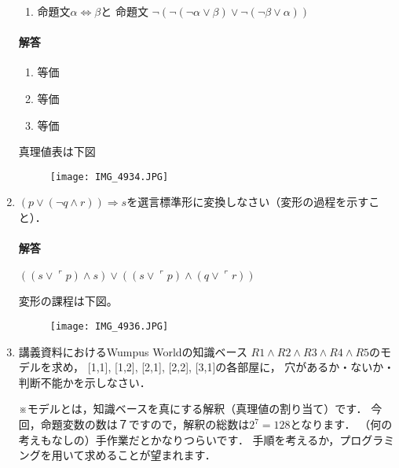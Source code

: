\documentclass[dvipdfmx]{jsarticle}
\begin{document}
\begin{enumerate}
\begin{enumerate}
  \item
    命題文$\alpha\Leftrightarrow\beta$と
    命題文
    $\neg( \neg(\neg\alpha\lor\beta)\lor\neg(\neg\beta\lor\alpha) )$
  \end{enumerate}
  \paragraph{解答}
  \begin{enumerate}
    \item 等価
    \item 等価
    \item 等価
  \end{enumerate}
  真理値表は下図
  \begin{figure}[H]
    \centering
    \texttt{[image: IMG\_4934.JPG]}
  \end{figure}


\item
  $(p\lor(\neg q\land r))\Rightarrow s$を選言標準形に変換しなさい（変形の過程を示すこと）．
\paragraph{解答}
$((s \vee \ulcorner p)\wedge s)\vee ((s\vee \ulcorner p)\wedge (q \vee \ulcorner r))$\par
変形の課程は下図。
\begin{figure}[H]
  \centering
  \texttt{[image: IMG\_4936.JPG]}
\end{figure}



\item
  講義資料におけるWumpus Worldの知識ベース
  $R1 \land R2 \land R3 \land R4 \land R5$のモデルを求め，
  [1,1], [1,2], [2,1], [2,2], [3,1]の各部屋に，
  穴があるか・ないか・判断不能かを示しなさい．

  ※モデルとは，知識ベースを真にする解釈（真理値の割り当て）です．
  今回，命題変数の数は７ですので，解釈の総数は$2^7=128$となります．
  （何の考えもなしの）手作業だとかなりつらいです．
  手順を考えるか，プログラミングを用いて求めることが望まれます．


\end{enumerate}
\end{document}
